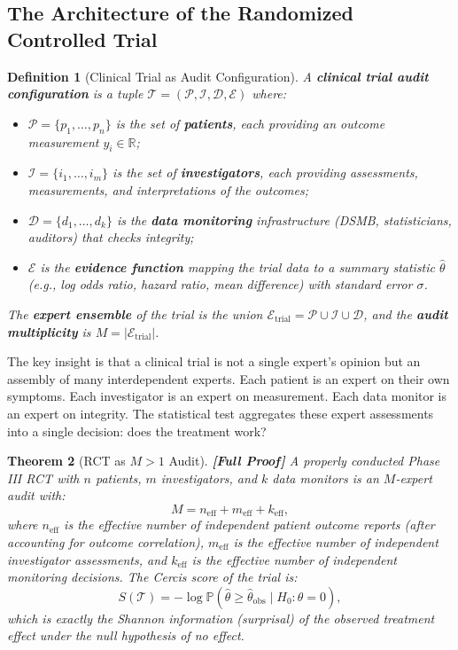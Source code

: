 \documentclass[12pt,a4paper]{article}
\newtheorem{theorem}{Theorem}[section]
\newtheorem{definition}[theorem]{Definition}
\theoremstyle{remark}
\newcommand{\R}{\mathbb{R}}
\newcommand{\Pbb}{\mathbb{P}}
\newcommand{\Cercis}{\textsf{Cercis}}
\newcommand{\rigorFull}{\textbf{[Full Proof]}}
\begin{document}
\subsection{The Architecture of the Randomized Controlled Trial}

\begin{definition}[Clinical Trial as Audit Configuration]
\label{def:clinical_trial}
A \textbf{clinical trial audit configuration} is a tuple
$\mathcal{T} = (\mathcal{P}, \mathcal{I}, \mathcal{D}, \mathcal{E})$ where:
\begin{itemize}[leftmargin=*]
  \item $\mathcal{P} = \{p_1, \ldots, p_n\}$ is the set of \textbf{patients},
  each providing an outcome measurement $y_i \in \R$;
  \item $\mathcal{I} = \{i_1, \ldots, i_m\}$ is the set of
  \textbf{investigators}, each providing assessments, measurements, and
  interpretations of the outcomes;
  \item $\mathcal{D} = \{d_1, \ldots, d_k\}$ is the \textbf{data monitoring}
  infrastructure (DSMB, statisticians, auditors) that checks integrity;
  \item $\mathcal{E}$ is the \textbf{evidence function} mapping the trial
  data to a summary statistic $\hat{\theta}$ (e.g., log odds ratio, hazard
  ratio, mean difference) with standard error $\sigma$.
\end{itemize}
The \textbf{expert ensemble} of the trial is the union
$\mathcal{E}_{\text{trial}} = \mathcal{P} \cup \mathcal{I} \cup \mathcal{D}$,
and the \textbf{audit multiplicity} is $M = |\mathcal{E}_{\text{trial}}|$.
\end{definition}

The key insight is that a clinical trial is not a single expert's opinion
but an assembly of many interdependent experts. Each patient is an expert
on their own symptoms. Each investigator is an expert on measurement.
Each data monitor is an expert on integrity. The statistical test aggregates
these expert assessments into a single decision: does the treatment work?

\begin{theorem}[RCT as $M>1$ Audit]
\label{thm:rct_audit}
\rigorFull
A properly conducted Phase III RCT with $n$ patients, $m$ investigators,
and $k$ data monitors is an $M$-expert audit with:
\begin{equation}
  M = n_{\text{eff}} + m_{\text{eff}} + k_{\text{eff}},
\end{equation}
where $n_{\text{eff}}$ is the effective number of independent patient
outcome reports (after accounting for outcome correlation), $m_{\text{eff}}$
is the effective number of independent investigator assessments, and
$k_{\text{eff}}$ is the effective number of independent monitoring
decisions. The \Cercis{} score of the trial is:
\begin{equation}
  S(\mathcal{T}) = -\log \Pbb(\hat{\theta} \geq \hat{\theta}_{\text{obs}}
  \mid H_0: \theta = 0),
\end{equation}
which is exactly the Shannon information (surprisal) of the observed
treatment effect under the null hypothesis of no effect.
\end{theorem}
\end{document}

